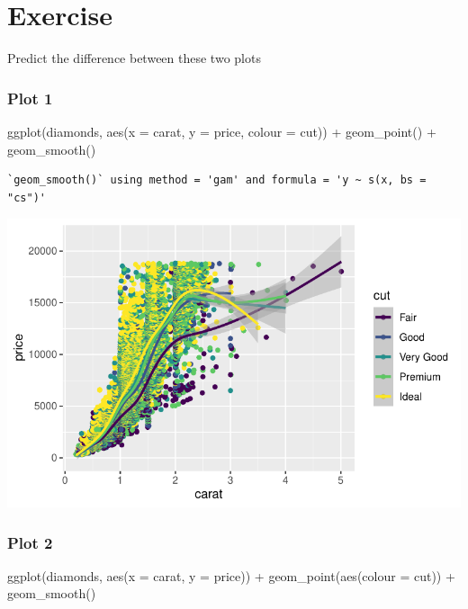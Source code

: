 \documentclass[
  letterpaper,
  DIV=11,
  numbers=noendperiod]{scrartcl}
\newenvironment{Shaded}{\begin{snugshade}}{\end{snugshade}}
\newcommand{\AttributeTok}[1]{\textcolor[rgb]{0.40,0.45,0.13}{#1}}
\newcommand{\FunctionTok}[1]{\textcolor[rgb]{0.28,0.35,0.67}{#1}}
\newcommand{\NormalTok}[1]{\textcolor[rgb]{0.00,0.23,0.31}{#1}}
\newcommand{\SpecialCharTok}[1]{\textcolor[rgb]{0.37,0.37,0.37}{#1}}
\begin{document}
\section{Exercise}\label{exercise-1}

Predict the difference between these two plots

\subsubsection{Plot 1}\label{plot-1}

\begin{Shaded}
\begin{Highlighting}[]
\FunctionTok{ggplot}\NormalTok{(diamonds, }\FunctionTok{aes}\NormalTok{(}\AttributeTok{x =}\NormalTok{ carat, }\AttributeTok{y =}\NormalTok{ price, }\AttributeTok{colour =}\NormalTok{ cut)) }\SpecialCharTok{+}
  \FunctionTok{geom\_point}\NormalTok{() }\SpecialCharTok{+}
  \FunctionTok{geom\_smooth}\NormalTok{()}
\end{Highlighting}
\end{Shaded}

\begin{verbatim}
`geom_smooth()` using method = 'gam' and formula = 'y ~ s(x, bs = "cs")'
\end{verbatim}

\includegraphics{5-ggplot2_kevin_files/figure-pdf/unnamed-chunk-9-1.pdf}

\subsubsection{Plot 2}\label{plot-2}

\begin{Shaded}
\begin{Highlighting}[]
\FunctionTok{ggplot}\NormalTok{(diamonds, }\FunctionTok{aes}\NormalTok{(}\AttributeTok{x =}\NormalTok{ carat, }\AttributeTok{y =}\NormalTok{ price)) }\SpecialCharTok{+}
  \FunctionTok{geom\_point}\NormalTok{(}\FunctionTok{aes}\NormalTok{(}\AttributeTok{colour =}\NormalTok{ cut)) }\SpecialCharTok{+}
  \FunctionTok{geom\_smooth}\NormalTok{()}
\end{Highlighting}
\end{Shaded}
\end{document}

